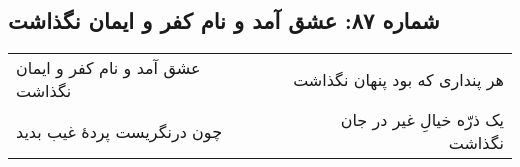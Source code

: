 \begin{center}
\section*{شماره ۸۷: عشق آمد و نام کفر و ایمان نگذاشت}
\label{sec:087}
\begin{longtable}{l p{0.5cm} r}
عشق آمد و نام کفر و ایمان نگذاشت
&&
هر پنداری که بود پنهان نگذاشت
\\
چون درنگریست پردهٔ غیب بدید
&&
یک ذرّه خیالِ غیر در جان نگذاشت
\\
\end{longtable}
\end{center}
